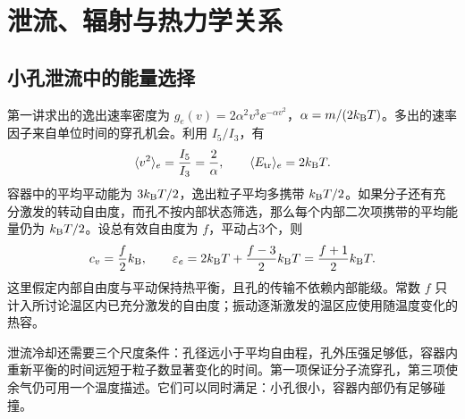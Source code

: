 \chapter{泄流、辐射与热力学关系}

\section{小孔泄流中的能量选择}
\label{th:effusion}
第一讲求出的逸出速率密度为 $g_e(v)=2\alpha^2v^3\ee^{-\alpha v^2}$，$\alpha=m/(2k_{\mathrm B} T)$。多出的速率因子来自单位时间的穿孔机会。利用 $I_5/I_3$，有
\[
 \langle v^2\rangle_e=\frac{I_5}{I_3}=\frac2\alpha,
 \qquad \langle E_{\rm tr}\rangle_e=2k_{\mathrm B} T.
\]
容器中的平均平动能为 $3k_{\mathrm B} T/2$，逸出粒子平均多携带 $k_{\mathrm B} T/2$。如果分子还有充分激发的转动自由度，而孔不按内部状态筛选，那么每个内部二次项携带的平均能量仍为 $k_{\mathrm B} T/2$。设总有效自由度为 $f$，平动占3个，则
\begin{equation}\label{eq:escapeenergy}
 c_v=\frac f2k_{\mathrm B},\qquad
 \varepsilon_e=2k_{\mathrm B} T+\frac{f-3}{2}k_{\mathrm B} T
 =\frac{f+1}{2}k_{\mathrm B} T.
\end{equation}
这里假定内部自由度与平动保持热平衡，且孔的传输不依赖内部能级。常数 $f$ 只计入所讨论温区内已充分激发的自由度；振动逐渐激发的温区应使用随温度变化的热容。

泄流冷却还需要三个尺度条件：孔径远小于平均自由程，孔外压强足够低，容器内重新平衡的时间远短于粒子数显著变化的时间。第一项保证分子流穿孔，第三项使余气仍可用一个温度描述。它们可以同时满足：小孔很小，容器内部仍有足够碰撞。

